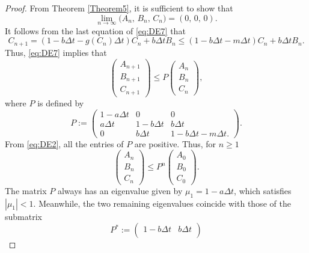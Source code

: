 \documentclass[10pt,a4paper]{amsart}
\begin{document}
\begin{proof}
From Theorem \ref{Theorem5}, it is sufficient to show that
\begin{equation*}
\lim_{n \to \infty}\big(A_n,\,B_n,\,C_n\big) = (0,\,0,\,0).
\end{equation*}
It follows from the last equation of \eqref{eq:DE7} that
\begin{equation*}
C_{n + 1} = (1 - b\Delta t - g(C_n)\Delta t)C_n +  b\Delta t B_n \leq (1 - b\Delta t - m\Delta t)C_n +  b\Delta t B_n.
\end{equation*}
Thus, \eqref{eq:DE7} implies that
\begin{equation*}
\begin{pmatrix}
A_{n + 1}\\
B_{n + 1}\\
C_{n + 1}
\end{pmatrix}
\leq
P
\begin{pmatrix}
A_n\\
B_n\\
C_n
\end{pmatrix},
\end{equation*}
where $P$ is defined by
\begin{equation*}
P :=
\begin{pmatrix}
1 - a\Delta t&0&0\\
a\Delta t&1 - b\Delta t& b\Delta t\\
0&b\Delta t & 1 - b\Delta t - m\Delta t.
\end{pmatrix}.
\end{equation*}
From \eqref{eq:DE2}, all the entries of $P$ are positive. Thus, for $n \geq 1$
\begin{equation}\label{eq:DE8}
\begin{pmatrix}
A_n\\
B_n\\
C_n
\end{pmatrix}
\leq P^n
\begin{pmatrix}
A_0\\
B_0\\
C_0
\end{pmatrix}.
\end{equation}
The matrix $P$ always has an eigenvalue given by $\mu_1 = 1 - a\Delta t$, which satisfies $|\mu_1| < 1$. Meanwhile, the two remaining eigenvalues coincide with those of the submatrix
%
\begin{equation*}
P^* :=
\begin{pmatrix}
1 - b\Delta t& b\Delta t\\

\end{pmatrix}
\end{equation*}
\end{proof}
\end{document}
